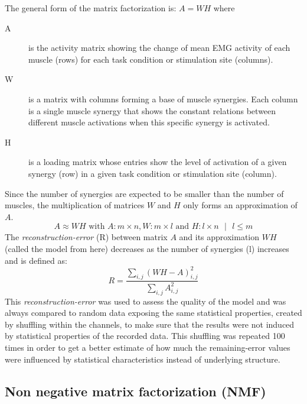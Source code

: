The general form of the matrix factorization is: $A = W H$ where 

\begin{description}
	\item[A] is the activity matrix showing the change of mean EMG activity of each muscle (rows) for each task condition or stimulation site (columns). 
	\item[W] is a matrix with columns forming a base of muscle synergies. Each column is a single muscle synergy that shows the constant relations between different muscle activations when this specific synergy is activated.
	\item[H] is a loading matrix whose entries show the level of activation of a given synergy (row) in a given task condition or stimulation site (column). 	
\end{description}
  
Since the number of synergies are expected to be smaller than the number of muscles, the multiplication of matrices $W$ and $H$ only forms an approximation of $A$.
\begin{equation}
	A \approx W H \text{ with } A: m \times n, W: m \times l \text{ and } H: l \times n \text{  } | \text{  } l \leq m
\end{equation}
The \emph{reconstruction-error} (R) between matrix $A$ and its approximation $W H$ (called the model from here) decreases as the number of synergies (l) increases and is defined as:
\begin{equation}
    \label{math:reconstruction}
    R = \frac
        {\sum_{i,j}{(W H - A)_{i,j}^2}}
        {\sum_{i,j}{A_{i,j}^2}}
\end{equation}
This \emph{reconstruction-error} was used to assess the quality of the model and was always compared to random data exposing the same statistical properties, created by shuffling within the channels, to make sure that the results were not induced by statistical properties of the recorded data. This shuffling was repeated 100 times in order to get a better estimate of how much the remaining-error values were influenced by statistical characteristics instead of underlying structure. 


\subsection{Non negative matrix factorization (NMF)} %
\label{sg:sub:nmf}


